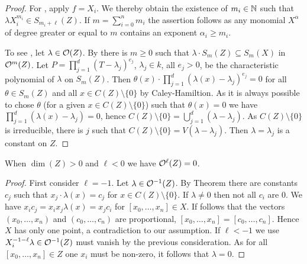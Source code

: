 \documentclass[a4paper,parskip=half,numbers=enddot, DIV=12]{scrreprt}
\begin{document}
\begin{proof}
    For , apply $f=X_i$. We thereby obtain the existence of $m_i\in\mathbb{N}$ such that $\lambda X_i^{m_i}\in S_{m_i+\ell}(Z)$. If $m = \sum_{i=0}^n m_i$ the assertion follows as any monomial $X^\alpha$ of degree greater or equal to $m$ contains an exponent $\alpha_i\geq m_i$.
    
    To see , let $\lambda\in \mathcal{O}(Z)$. By  there is $m\geq 0$ such that $\lambda\cdot S_m(Z) \subseteq S_m(X)$ in $\mathcal{O}^m(Z)$. Let $P = \prod_{j=1}^d (T-\lambda_j)^{e_j}$, $\lambda_j\in k$, all $e_j>0$, be the characteristic polynomial of $\lambda$ on $S_m(Z)$. Then $\theta(x)\cdot\prod_{j=1}^d (\lambda(x)-\lambda_j)^{e_j} = 0$ for all $\theta\in S_m(Z)$ and all $x\in C(Z)\setminus \{0\}$ by Caley-Hamiltion. As it is always possible to chose $\theta$ (for a given $x\in C(Z)\setminus\{0\}$) such that $\theta(x)=0$ we have $\prod_{j=1}^d (\lambda(x)-\lambda_j) = 0$, hence $C(Z)\setminus \{0\} = \bigcup_{j=1}^d (\lambda-\lambda_j)$. As $C(Z)\setminus \{0\}$ is irreducible, there is $j$ such that $C(Z)\setminus\{0\} = V(\lambda-\lambda_j)$. Then $\lambda=\lambda_j$ is a constant on $Z$. 
\end{proof}
\begin{cor}
    When $\dim(Z) >0$ and $\ell<0$ we have $\mathcal{O}^\ell(Z) = 0$.
\end{cor}
\begin{proof}
    First consider $\ell=-1$. Let $\lambda\in \mathcal{O}^{-1}(Z)$. By Theorem  there are constants $c_j$ such that $x_j\cdot \lambda(x) = c_j$ for $x\in C(Z)\setminus\{0\}$. If $\lambda\neq 0$ then not all $c_i$ are $0$. We have $x_ic_j = x_ix_j\lambda(x) = x_jc_i$ for $[x_0,\ldots, x_n]\in X$. If follows that the vectors $(x_0,\ldots, x_n)$ and $(c_0,\ldots, c_n)$ are proportional, $[x_0,\ldots, x_n] = [c_0,\ldots, c_n]$. Hence $X$ has only one point, a contradiction to our assumption. If $\ell<-1$ we use $X_i^{-1-\ell}\lambda\in \mathcal{O}^{-1}(Z)$ must vanish by the previous consideration. As for all $[x_0,\ldots,x_n]\in Z$ one $x_i$ must be non-zero, it follows that $\lambda = 0$.
\end{proof}
\end{document}

